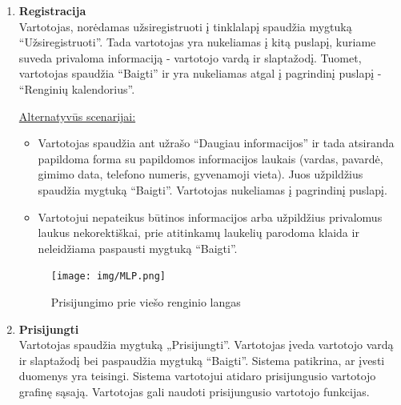 \documentclass{VUMIFPSkursinis}
\begin{document}
\begin{enumerate} [label = \textbf{U\arabic*.}]
					\underline{Alternatyvūs scenarijai:}
					\begin{itemize}
						\item Vartotojas nėra prisijungęs ir privalo užpildyti elektroninio pašto lauką, nes kitaip negalima paspausti mygtuko “Baigta”.
					\end{itemize}

				\begin{figure}[H]
					\centering
					\texttt{[image: img/MLP.png]}
					\caption{Konkretaus renginio langas}
					\label{fig:konkretaus-renginio-langas}
				\end{figure}
				
			\item \textbf{Registracija} \\
					Vartotojas, norėdamas užsiregistruoti į tinklalapį spaudžia mygtuką “Užsiregistruoti”. Tada vartotojas yra nukeliamas į kitą puslapį, kuriame suveda privaloma informaciją - vartotojo vardą ir slaptažodį. Tuomet, vartotojas spaudžia “Baigti” ir yra nukeliamas atgal į pagrindinį puslapį - “Renginių kalendorius”.
							
					\underline{Alternatyvūs scenarijai:}
					\begin{itemize}
						\item Vartotojas spaudžia ant užrašo “Daugiau informacijos” ir tada atsiranda papildoma forma su papildomos informacijos laukais (vardas, pavardė, gimimo data, telefono numeris, gyvenamoji vieta). Juos užpildžius spaudžia mygtuką “Baigti”. Vartotojas nukeliamas į pagrindinį puslapį.
						\item Vartotojui nepateikus būtinos informacijos arba užpildžius privalomus laukus nekorektiškai, prie atitinkamų laukelių parodoma klaida ir neleidžiama paspausti mygtuką “Baigti”.
					\end{itemize}

				\begin{figure}[H]
					\centering
					\texttt{[image: img/MLP.png]}
					\caption{Prisijungimo prie viešo renginio langas}
					\label{fig:prisijungti-prie-vieso-renginio}
				\end{figure}

			\item \textbf{Prisijungti} \\
					Vartotojas spaudžia mygtuką „Prisijungti”. Vartotojas įveda vartotojo vardą ir slaptažodį bei paspaudžia mygtuką “Baigti”. Sistema patikrina, ar įvesti duomenys yra teisingi. Sistema vartotojui atidaro prisijungusio vartotojo grafinę sąsają. Vartotojas gali naudoti prisijungusio vartotojo funkcijas. 
					

\end{enumerate}
\end{document}
